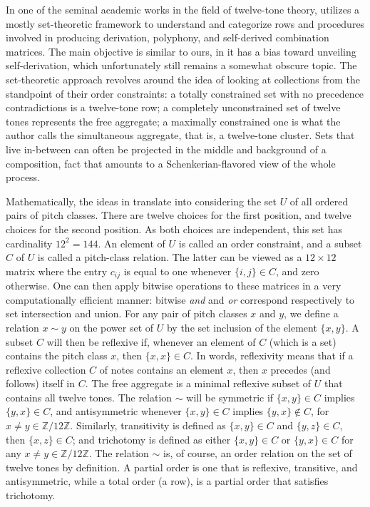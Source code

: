 In one of the seminal academic works in the field of twelve-tone theory, \cite{Starr1984} utilizes a mostly set-theoretic framework to understand and categorize rows and procedures involved in producing derivation, polyphony, and self-derived combination matrices. The main objective is similar to ours, in it has a bias toward unveiling self-derivation, which unfortunately still remains a somewhat obscure topic. The set-theoretic approach revolves around the idea of looking at collections from the standpoint of their order constraints: a totally constrained set with no precedence contradictions is a twelve-tone row; a completely unconstrained set of twelve tones represents the free aggregate; a maximally constrained one is what the author calls the simultaneous aggregate, that is, a twelve-tone cluster. Sets that live in-between can often be projected in the middle and background of a composition, fact that amounts to a Schenkerian-flavored view of the whole process.

Mathematically, the ideas in \cite{Starr1984} translate into considering the set $U$ of all ordered pairs of pitch classes. There are twelve choices for the first position, and twelve choices for the second position. As both choices are independent, this set has cardinality $12^2 = 144$. An element of $U$ is called an order constraint, and a subset $C$ of $U$ is called a pitch-class relation. The latter can be viewed as a $12 \times 12$ matrix where the entry $c_{ij}$ is equal to one whenever $\{ i, j \} \in C$, and zero otherwise. One can then apply bitwise operations to these matrices in a very computationally efficient manner: bitwise \emph{and} and \emph{or} correspond respectively to set intersection and union. For any pair of pitch classes $x$ and $y$, we define a relation $x \sim y$ on the power set of $U$ by the set inclusion of the element $\{ x, y \}$. A subset $C$ will then be reflexive if, whenever an element of $C$ (which is a set) contains the pitch class $x$, then $\{ x, x \} \in C$. In words, reflexivity means that if a reflexive collection $C$ of notes contains an element $x$, then $x$ precedes (and follows) itself in $C$. The free aggregate is a minimal reflexive subset of $U$ that contains all twelve tones. The relation $\sim$ will be symmetric if $\{ x, y \} \in C$ implies $\{ y, x \} \in C$, and antisymmetric whenever $\{ x, y \} \in C$ implies $\{ y, x \} \notin C$, for $x \ne y \in \mathbb{Z}/ 12 \mathbb{Z}$. Similarly, transitivity is defined as $\{ x, y \} \in C$ and $\{ y, z \} \in C$, then $\{ x, z\} \in C$; and trichotomy is defined as either $\{ x, y \} \in C$ or $\{ y, x \} \in C$ for any $x \ne y \in \mathbb{Z}/ 12 \mathbb{Z}$. The relation $\sim$ is, of course, an order relation on the set of twelve tones by definition. A partial order is one that is reflexive, transitive, and antisymmetric, while a total order (a row), is a partial order that satisfies trichotomy.


